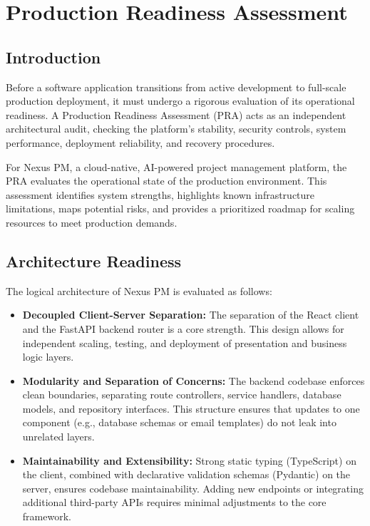 \chapter{Production Readiness Assessment}
\label{chap:production-readiness}

\section{Introduction}
Before a software application transitions from active development to full-scale production deployment, it must undergo a rigorous evaluation of its operational readiness. A Production Readiness Assessment (PRA) acts as an independent architectural audit, checking the platform's stability, security controls, system performance, deployment reliability, and recovery procedures.

For Nexus PM, a cloud-native, AI-powered project management platform, the PRA evaluates the operational state of the production environment. This assessment identifies system strengths, highlights known infrastructure limitations, maps potential risks, and provides a prioritized roadmap for scaling resources to meet production demands.

\section{Architecture Readiness}
The logical architecture of Nexus PM is evaluated as follows:
\begin{itemize}
    \item \textbf{Decoupled Client-Server Separation:} The separation of the React client and the FastAPI backend router is a core strength. This design allows for independent scaling, testing, and deployment of presentation and business logic layers.
    \item \textbf{Modularity and Separation of Concerns:} The backend codebase enforces clean boundaries, separating route controllers, service handlers, database models, and repository interfaces. This structure ensures that updates to one component (e.g., database schemas or email templates) do not leak into unrelated layers.
    \item \textbf{Maintainability and Extensibility:} Strong static typing (TypeScript) on the client, combined with declarative validation schemas (Pydantic) on the server, ensures codebase maintainability. Adding new endpoints or integrating additional third-party APIs requires minimal adjustments to the core framework.
\end{itemize}

